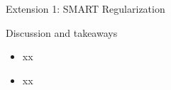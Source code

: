 \documentclass[final]{beamer}
\newlength{\colwidth}
\begin{document}
\begin{frame}[t]
\begin{columns}[t]
\begin{column}{\colwidth}
\begin{block}{Extension 1: SMART Regularization}

  \end{block}

\begin{alertblock}{\small Discussion and takeaways}

\begin{itemize}

 \item xx
 \item xx

\end{itemize}

\end{alertblock}


\end{column}
\end{columns}
\end{frame}
\end{document}

